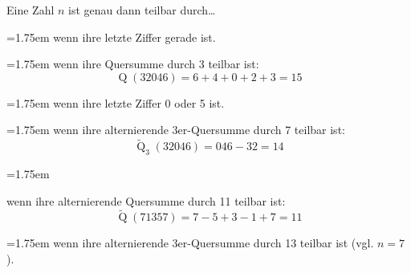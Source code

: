 \begingroup
\newcommand{\numbox}[1]{\par\hangindent=1.75em\makebox[1.75em][r]{\textbf{#1},\enskip}\ignorespaces}%
Eine Zahl $n$ ist genau dann teilbar durch\ldots\medskip
\numbox{2} wenn ihre letzte Ziffer gerade ist.
\numbox{3} wenn ihre Quersumme durch 3 teilbar ist:
           \begin{equation*}
             \operatorname{Q}(\num{32046})=6+4+0+2+3=15
           \end{equation*}
\numbox{5} wenn ihre letzte Ziffer 0 oder 5 ist.
\numbox{7} wenn ihre alternierende 3er-Quer\-sum\-me durch 7 teilbar ist:
           \begin{equation*}
             \tilde{\operatorname{Q}}_3(\num{32046})=046-32=14
           \end{equation*}
\numbox{11} \raggedright
            wenn ihre alternierende Quersumme durch 11 teilbar ist:
            \begin{equation*}
              \tilde{\operatorname{Q}}(\num{71357})=7-5+3-1+7=11
            \end{equation*}
\numbox{13} wenn ihre alternierende 3er-Quer\-sum\-me durch 13 teilbar
            ist (vgl. $n=7$).\par
\endgroup

